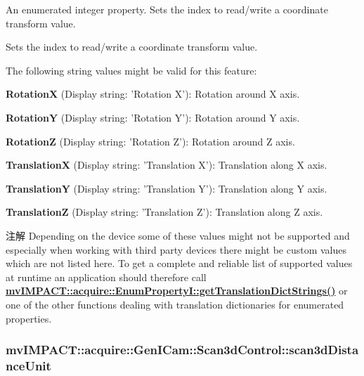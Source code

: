 An enumerated integer property. Sets the index to read/write a coordinate transform value. 

Sets the index to read/write a coordinate transform value.

The following string values might be valid for this feature\+:
\begin{DoxyItemize}
\item {\bfseries Rotation\+X} (Display string\+: 'Rotation X')\+: Rotation around X axis.
\item {\bfseries Rotation\+Y} (Display string\+: 'Rotation Y')\+: Rotation around Y axis.
\item {\bfseries Rotation\+Z} (Display string\+: 'Rotation Z')\+: Rotation around Z axis.
\item {\bfseries Translation\+X} (Display string\+: 'Translation X')\+: Translation along X axis.
\item {\bfseries Translation\+Y} (Display string\+: 'Translation Y')\+: Translation along Y axis.
\item {\bfseries Translation\+Z} (Display string\+: 'Translation Z')\+: Translation along Z axis.
\end{DoxyItemize}

\begin{DoxyNote}{注解}
Depending on the device some of these values might not be supported and especially when working with third party devices there might be custom values which are not listed here. To get a complete and reliable list of supported values at runtime an application should therefore call {\bfseries \hyperlink{classmv_i_m_p_a_c_t_1_1acquire_1_1_enum_property_i_a0ba6ccbf5ee69784d5d0b537924d26b6}{mv\+I\+M\+P\+A\+C\+T\+::acquire\+::\+Enum\+Property\+I\+::get\+Translation\+Dict\+Strings()}} or one of the other functions dealing with translation dictionaries for enumerated properties. 
\end{DoxyNote}
\hypertarget{classmv_i_m_p_a_c_t_1_1acquire_1_1_gen_i_cam_1_1_scan3d_control_a8c28d5ecbb3763fa21b93814aab6cce1}{
\subsubsection[{scan3d\+Distance\+Unit}]{ mv\+I\+M\+P\+A\+C\+T\+::acquire\+::\+Gen\+I\+Cam\+::\+Scan3d\+Control\+::scan3d\+Distance\+Unit}}\label{classmv_i_m_p_a_c_t_1_1acquire_1_1_gen_i_cam_1_1_scan3d_control_a8c28d5ecbb3763fa21b93814aab6cce1}


